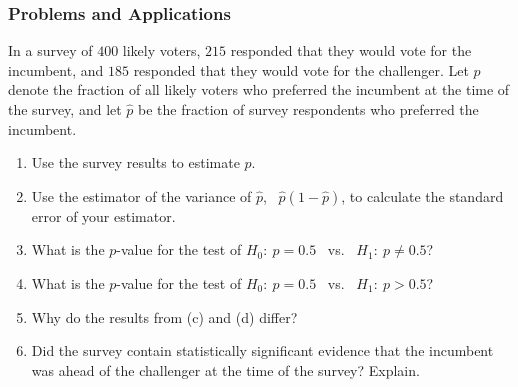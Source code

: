 

\begin{frame}
\frametitle{Problems and Applications}
In a survey of $400$ likely voters, $215$ responded that they would vote for the incumbent, and $185$ responded that they would vote for the challenger. Let $p$ denote the fraction of all likely voters who preferred the incumbent at the time of the survey, and let $\hat{p}$ be the fraction of survey respondents who preferred the incumbent.
\begin{enumerate}
\item Use the survey results to estimate $p$.
\item Use the estimator of the variance of $\hat{p}$,~  $\hat{p}(1-\hat{p})$, to calculate the standard error of your estimator. 
\item What is the $p$-value for the test of $H_{0}{:}~ p=0.5$ ~vs.~ $H_{1}{:}~ p\neq 0.5$?
\item What is the $p$-value for the test of $H_{0}{:}~ p=0.5$ ~vs.~ $H_{1}{:}~ p > 0.5$?
\item Why do the results from (c) and (d) differ?
\item Did the survey contain statistically significant evidence that the incumbent was ahead of the challenger at the time of the survey? Explain.
\end{enumerate}
\end{frame}

